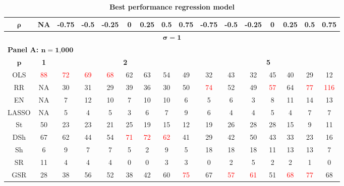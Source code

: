 \begin{table}
\centering
\setlength{\tabcolsep}{5pt}
\renewcommand{\arraystretch}{0.6}
\caption{\textbf{Best performance regression model}}
\label{tab:simulated_generic_binomial}
\footnotesize{
\begin{tabular*}{\textwidth}{@{\extracolsep{\fill}}c|c|ccccccc|ccccccc@{}}
\hline
$\bm\rho$ & \textbf{NA} & \textbf{-0.75} & \textbf{-0.5} & \textbf{-0.25} & \textbf{0} & \textbf{0.25} & \textbf{0.5} & \textbf{0.75} & \textbf{-0.75} & \textbf{-0.5} & \textbf{-0.25} & \textbf{0} & \textbf{0.25} & \textbf{0.5} & \textbf{0.75} \\
\hline
\multicolumn{16}{c}{$\bm\sigma=\textbf{1}$}\\
\hline

\multicolumn{16}{l}{\textbf{Panel A: $\bm n=\textbf{1,000}$}}\\
\hline
$\bm p$ & \textbf{1} & \multicolumn{7}{c|}{\textbf{2}} & \multicolumn{7}{c}{\textbf{5}} \\
\hline
OLS & \textcolor{red}{88} & \textcolor{red}{72} & \textcolor{red}{69} & \textcolor{red}{68} & 62 & 63 & 54 & 49 & 32 & 43 & 32 & 45 & 40 & 29 & 12 \\
RR & NA & 30 & 31 & 29 & 39 & 36 & 30 & 50 & \textcolor{red}{74} & 52 & 49 & \textcolor{red}{57} & 64 & \textcolor{red}{77} & \textcolor{red}{116} \\
EN & NA & 7 & 12 & 10 & 7 & 10 & 10 & 6 & 5 & 6 & 3 & 8 & 11 & 14 & 13 \\
LASSO & NA & 5 & 4 & 5 & 3 & 6 & 7 & 9 & 6 & 4 & 4 & 5 & 4 & 7 & 7 \\
St & 50 & 23 & 23 & 21 & 25 & 19 & 15 & 12 & 19 & 26 & 28 & 28 & 15 & 9 & 11 \\
DSh & 67 & 62 & 44 & 54 & \textcolor{red}{71} & \textcolor{red}{72} & \textcolor{red}{62} & 41 & 29 & 42 & 50 & 43 & 33 & 23 & 16 \\
Sh & 6 & 9 & 7 & 7 & 5 & 2 & 9 & 5 & 18 & 18 & 18 & 11 & 13 & 13 & 7 \\
SR & 11 & 4 & 4 & 4 & 0 & 0 & 3 & 3 & 0 & 2 & 5 & 2 & 2 & 1 & 0 \\
GSR & 28 & 38 & 56 & 52 & 38 & 42 & 60 & \textcolor{red}{75} & 67 & \textcolor{red}{57} & \textcolor{red}{61} & 51 & \textcolor{red}{68} & \textcolor{red}{77} & 68 \\
\hline


\end{tabular*}}
\end{table}
